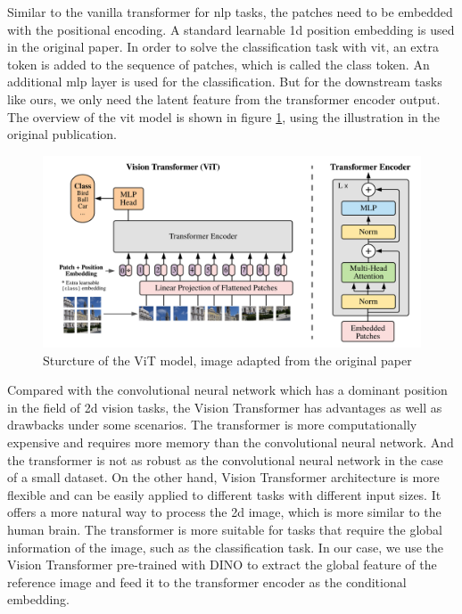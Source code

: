 \documentclass[12pt,DIV14,BCOR12mm,a4paper,footinclude=false,headinclude,parskip=half-,twoside,openright,cleardoublepage=empty,toc=index,bibliography=totoc,listof=totoc]{scrreprt}
\numberwithin{equation}{chapter}
\begin{document}
Similar to the vanilla transformer for \gls{nlp} tasks, the patches need to be embedded with the positional encoding. A standard learnable \gls{1d} position embedding is used in the original paper. In order to solve the classification task with \gls{vit}, an extra token is added to the sequence of patches, which is called the class token. An additional \gls{mlp} layer is used for the classification. But for the downstream tasks like ours, we only need the latent feature from the transformer encoder output. The overview of the \gls{vit} model is shown in figure \ref{img:vit}, using the illustration in the original publication.
\begin{figure}[h]
	\centering
	\includegraphics[width=1.0\textwidth]{img/vit.png}
	\caption{Sturcture of the ViT model, image adapted from the original paper \cite{dosovitskiy2021image}}
	\label{img:vit}
\end{figure}

Compared with the convolutional neural network which has a dominant position in the field of \gls{2d} vision tasks, the Vision Transformer has advantages as well as drawbacks under some scenarios. The transformer is more computationally expensive and requires more memory than the convolutional neural network. And the transformer is not as robust as the convolutional neural network in the case of a small dataset. On the other hand, Vision Transformer architecture is more flexible and can be easily applied to different tasks with different input sizes. It offers a more natural way to process the \gls{2d} image, which is more similar to the human brain. The transformer is more suitable for tasks that require the global information of the image, such as the classification task. In our case, we use the Vision Transformer pre-trained with DINO to extract the global feature of the reference image and feed it to the transformer encoder as the conditional embedding.
\end{document}
